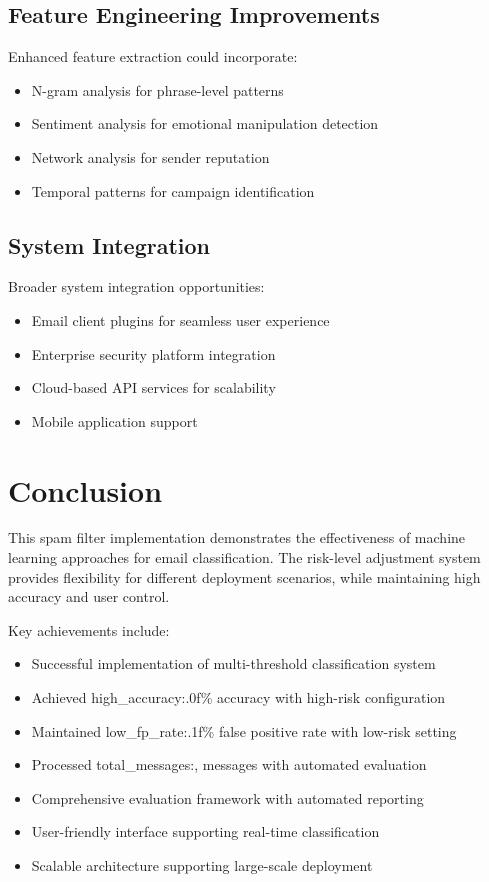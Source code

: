 \documentclass[12pt,a4paper]{article}
\begin{document}
\subsection{Feature Engineering Improvements}

Enhanced feature extraction could incorporate:
\begin{itemize}
    \item N-gram analysis for phrase-level patterns
    \item Sentiment analysis for emotional manipulation detection
    \item Network analysis for sender reputation
    \item Temporal patterns for campaign identification
\end{itemize}

\subsection{System Integration}

Broader system integration opportunities:
\begin{itemize}
    \item Email client plugins for seamless user experience
    \item Enterprise security platform integration
    \item Cloud-based API services for scalability
    \item Mobile application support
\end{itemize}

\section{Conclusion}

This spam filter implementation demonstrates the effectiveness of machine learning approaches for email classification. The risk-level adjustment system provides flexibility for different deployment scenarios, while maintaining high accuracy and user control.

Key achievements include:
\begin{itemize}
    \item Successful implementation of multi-threshold classification system
    \item Achieved {high_accuracy:.0f}\% accuracy with high-risk configuration
    \item Maintained {low_fp_rate:.1f}\% false positive rate with low-risk setting
    \item Processed {total_messages:,} messages with automated evaluation
    \item Comprehensive evaluation framework with automated reporting
    \item User-friendly interface supporting real-time classification
    \item Scalable architecture supporting large-scale deployment
\end{itemize}
\end{document}
